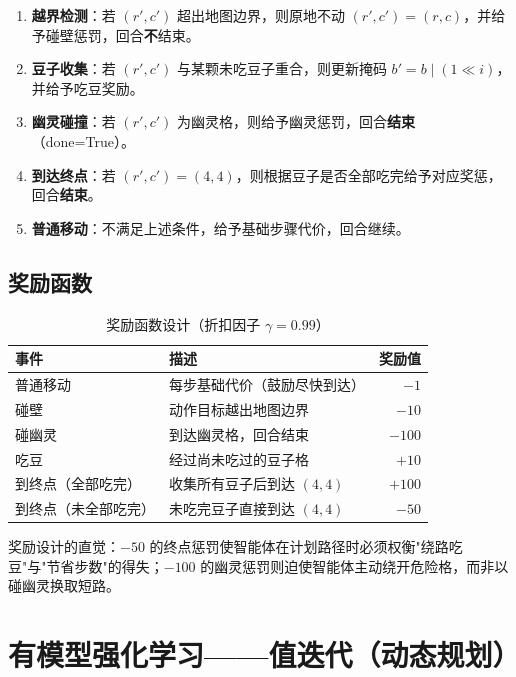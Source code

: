 \documentclass[12pt,a4paper]{ctexart}
\begin{document}
\begin{enumerate}
    \item \textbf{越界检测}：若 $(r',c')$ 超出地图边界，则原地不动 $(r',c') = (r,c)$，并给予碰壁惩罚，回合\textbf{不}结束。
    \item \textbf{豆子收集}：若 $(r',c')$ 与某颗未吃豆子重合，则更新掩码 $b' = b \mid (1 \ll i)$，并给予吃豆奖励。
    \item \textbf{幽灵碰撞}：若 $(r',c')$ 为幽灵格，则给予幽灵惩罚，回合\textbf{结束}（done=True）。
    \item \textbf{到达终点}：若 $(r',c') = (4,4)$，则根据豆子是否全部吃完给予对应奖惩，回合\textbf{结束}。
    \item \textbf{普通移动}：不满足上述条件，给予基础步骤代价，回合继续。
\end{enumerate}

\subsection{奖励函数}

\begin{table}[H]
    \centering
    \begin{tabular}{llr}
        \toprule
        \textbf{事件} & \textbf{描述} & \textbf{奖励值} \\
        \midrule
        普通移动 & 每步基础代价（鼓励尽快到达） & $-1$ \\
        碰壁     & 动作目标越出地图边界           & $-10$ \\
        碰幽灵   & 到达幽灵格，回合结束           & $-100$ \\
        吃豆     & 经过尚未吃过的豆子格           & $+10$ \\
        到终点（全部吃完）& 收集所有豆子后到达 $(4,4)$     & $+100$ \\
        到终点（未全部吃完）& 未吃完豆子直接到达 $(4,4)$   & $-50$ \\
        \bottomrule
    \end{tabular}
    \caption{奖励函数设计（折扣因子 $\gamma = 0.99$）}
\end{table}

奖励设计的直觉：$-50$ 的终点惩罚使智能体在计划路径时必须权衡"绕路吃豆"与"节省步数"的得失；$-100$ 的幽灵惩罚则迫使智能体主动绕开危险格，而非以碰幽灵换取短路。

\section{有模型强化学习——值迭代（动态规划）}
\end{document}
